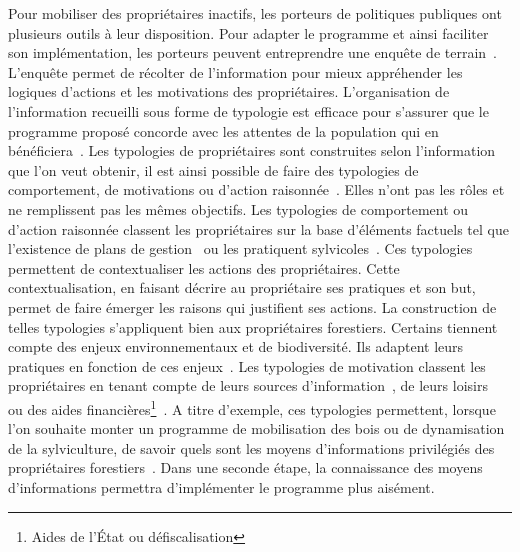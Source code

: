 \documentclass[12pt]{report}
\begin{document}
Pour mobiliser des propriétaires inactifs, les porteurs de politiques publiques
ont plusieurs outils à leur disposition. Pour adapter le programme et ainsi
faciliter son implémentation, les porteurs peuvent entreprendre une enquête de
terrain~\citep{IRSTEA_ref61}. L'enquête permet de récolter de l'information pour
mieux appréhender les logiques d'actions et les motivations des propriétaires.
L'organisation de l'information recueilli sous forme de typologie est efficace
pour s'assurer que le programme proposé concorde avec les attentes de la
population qui en bénéficiera~\citep{boon2004_ref101,majumdar2008_ref103}.
Les typologies de propriétaires sont construites selon l'information que l'on
veut obtenir, il est ainsi possible de faire des typologies de comportement, de
motivations ou d'action raisonnée~\citep{dayer2014_ref95}. Elles n'ont pas les
rôles et ne remplissent pas les mêmes objectifs. Les typologies de comportement
ou d'action raisonnée classent les propriétaires sur la base d'éléments factuels
tel que l'existence de plans de gestion~\citep{young2015_ref104,ross-davis2007_ref94}
ou les pratiquent sylvicoles~\citep{bohlin2002_ref96,selter2009_ref93,novais2010_ref92}.
Ces typologies permettent de contextualiser les actions des propriétaires. Cette
contextualisation, en faisant décrire au propriétaire ses pratiques et son but,
permet de faire émerger les raisons qui justifient ses actions. La construction
de telles typologies s'appliquent bien aux propriétaires forestiers. Certains
tiennent compte des enjeux environnementaux et de biodiversité. Ils adaptent
leurs pratiques en fonction de ces enjeux~\citep{häyrinen2014_ref102}. Les typologies de motivation
classent les propriétaires en tenant compte de leurs sources d'information~\citep{ross-davis2007_ref94},
de leurs loisirs~\citep{ross-davis2007_ref94,tian2015_ref105} ou des aides
financières\footnote{Aides de l’État ou défiscalisation}~\citep{tian2015_ref105,
halder2016_ref106}. A titre d'exemple, ces typologies permettent, lorsque l'on souhaite monter un
programme de mobilisation des bois ou de dynamisation de la sylviculture, de
savoir quels sont les moyens d'informations privilégiés des propriétaires
forestiers~\citep{foretEntreprise233_ref107}. Dans une seconde étape, la
connaissance des moyens d'informations permettra d'implémenter le programme plus
aisément.\\
\end{document}
